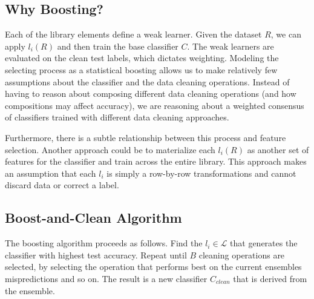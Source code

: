 \subsection{Why Boosting?}
Each of the library elements define a weak learner.
Given the dataset $R$, we can apply $l_i(R)$ and then train the base classifier $C$. 
The weak learners are evaluated on the clean test labels, which dictates weighting.
Modeling the selecting process as a statistical boosting allows us to make relatively few assumptions about the classifier and the data cleaning operations. 
Instead of having to reason about composing different data cleaning operations (and how compositions may affect accuracy), we are reasoning about a weighted consensus of classifiers trained with different data cleaning approaches.

Furthermore, there is a subtle relationship between this process and feature selection.
Another approach could be to materialize each $l_i(R)$ as another set of features for the classifier and train across the entire library.
This approach makes an assumption that each $l_i$ is simply a row-by-row transformations and cannot discard data or correct a label.

\subsection{Boost-and-Clean Algorithm}\label{s:boostalg}
The boosting algorithm proceeds as follows.
Find the $l_i \in \mathcal{L}$ that generates the classifier with highest test accuracy.
Repeat until $B$ cleaning operations are selected, by selecting the operation that performs best on the current ensembles mispredictions and so on.
The result is a new classifier $C_{clean}$ that is derived from the ensemble.

